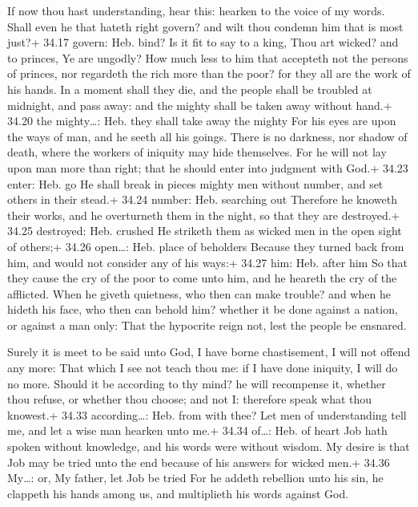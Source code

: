  If now thou hast understanding, hear this: hearken to the
voice of my words.  Shall even he that hateth right govern?
and wilt thou condemn him that is most just?+ 34.17 govern: Heb. bind?
 Is it fit to say to a king, Thou art wicked? and to
princes, Ye are ungodly?  How much less to him that
accepteth not the persons of princes, nor regardeth the rich more than
the poor? for they all are the work of his hands.  In a
moment shall they die, and the people shall be troubled at midnight, and
pass away: and the mighty shall be taken away without hand.+ 34.20 the
mighty\ldots: Heb. they shall take away the mighty  For his
eyes are upon the ways of man, and he seeth all his goings.
 There is no darkness, nor shadow of death, where the
workers of iniquity may hide themselves.  For he will not
lay upon man more than right; that he should enter into judgment with
God.+ 34.23 enter: Heb. go  He shall break in pieces mighty
men without number, and set others in their stead.+ 34.24 number: Heb.
searching out  Therefore he knoweth their works, and he
overturneth them in the night, so that they are destroyed.+ 34.25
destroyed: Heb. crushed  He striketh them as wicked men in
the open sight of others;+ 34.26 open\ldots: Heb. place of beholders
 Because they turned back from him, and would not consider
any of his ways:+ 34.27 him: Heb. after him  So that they
cause the cry of the poor to come unto him, and he heareth the cry of
the afflicted.  When he giveth quietness, who then can make
trouble? and when he hideth his face, who then can behold him? whether
it be done against a nation, or against a man only:  That
the hypocrite reign not, lest the people be ensnared.

 Surely it is meet to be said unto God, I have borne
chastisement, I will not offend any more:  That which I see
not teach thou me: if I have done iniquity, I will do no more.
 Should it be according to thy mind? he will recompense it,
whether thou refuse, or whether thou choose; and not I: therefore speak
what thou knowest.+ 34.33 according\ldots: Heb. from with thee?
 Let men of understanding tell me, and let a wise man
hearken unto me.+ 34.34 of\ldots: Heb. of heart  Job hath
spoken without knowledge, and his words were without wisdom.
 My desire is that Job may be tried unto the end because of
his answers for wicked men.+ 34.36 My\ldots: or, My father, let Job be
tried  For he addeth rebellion unto his sin, he clappeth
his hands among us, and multiplieth his words against God.

